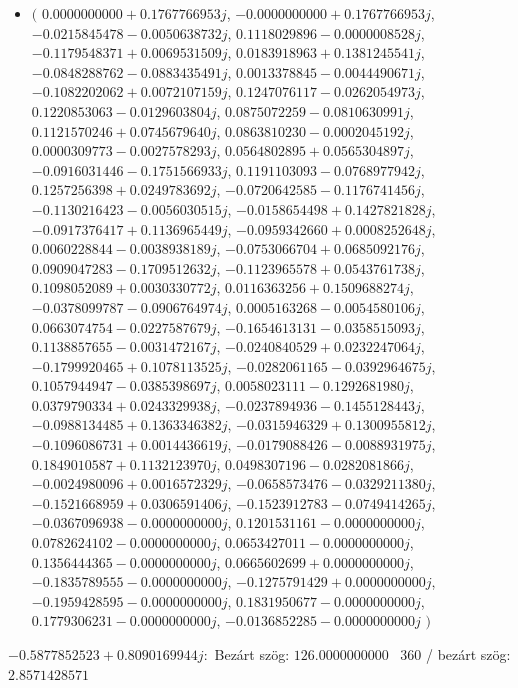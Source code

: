 \documentclass[14pt,a4paper]{article}
\begin{document}
\begin{itemize}
\item
$\big($
$0.0000000000+0.1767766953j$, $-0.0000000000+0.1767766953j$, $-0.0215845478-0.0050638732j$, $0.1118029896-0.0000008528j$, $-0.1179548371+0.0069531509j$, $0.0183918963+0.1381245541j$, $-0.0848288762-0.0883435491j$, $0.0013378845-0.0044490671j$, $-0.1082202062+0.0072107159j$, $0.1247076117-0.0262054973j$, $0.1220853063-0.0129603804j$, $0.0875072259-0.0810630991j$, $0.1121570246+0.0745679640j$, $0.0863810230-0.0002045192j$, $0.0000309773-0.0027578293j$, $0.0564802895+0.0565304897j$, $-0.0916031446-0.1751566933j$, $0.1191103093-0.0768977942j$, $0.1257256398+0.0249783692j$, $-0.0720642585-0.1176741456j$, $-0.1130216423-0.0056030515j$, $-0.0158654498+0.1427821828j$, $-0.0917376417+0.1136965449j$, $-0.0959342660+0.0008252648j$, $0.0060228844-0.0038938189j$, $-0.0753066704+0.0685092176j$, $0.0909047283-0.1709512632j$, $-0.1123965578+0.0543761738j$, $0.1098052089+0.0030330772j$, $0.0116363256+0.1509688274j$, $-0.0378099787-0.0906764974j$, $0.0005163268-0.0054580106j$, $0.0663074754-0.0227587679j$, $-0.1654613131-0.0358515093j$, $0.1138857655-0.0031472167j$, $-0.0240840529+0.0232247064j$, $-0.1799920465+0.1078113525j$, $-0.0282061165-0.0392964675j$, $0.1057944947-0.0385398697j$, $0.0058023111-0.1292681980j$, $0.0379790334+0.0243329938j$, $-0.0237894936-0.1455128443j$, $-0.0988134485+0.1363346382j$, $-0.0315946329+0.1300955812j$, $-0.1096086731+0.0014436619j$, $-0.0179088426-0.0088931975j$, $0.1849010587+0.1132123970j$, $0.0498307196-0.0282081866j$, $-0.0024980096+0.0016572329j$, $-0.0658573476-0.0329211380j$, $-0.1521668959+0.0306591406j$, $-0.1523912783-0.0749414265j$, $-0.0367096938-0.0000000000j$, $0.1201531161-0.0000000000j$, $0.0782624102-0.0000000000j$, $0.0653427011-0.0000000000j$, $0.1356444365-0.0000000000j$, $0.0665602699+0.0000000000j$, $-0.1835789555-0.0000000000j$, $-0.1275791429+0.0000000000j$, $-0.1959428595-0.0000000000j$, $0.1831950677-0.0000000000j$, $0.1779306231-0.0000000000j$, $-0.0136852285-0.0000000000j$
$\big)$
\end{itemize}
$-0.5877852523+0.8090169944j$:\
Bezárt szög: $126.0000000000$ \
360 / bezárt szög: $2.8571428571$\
\end{document}

